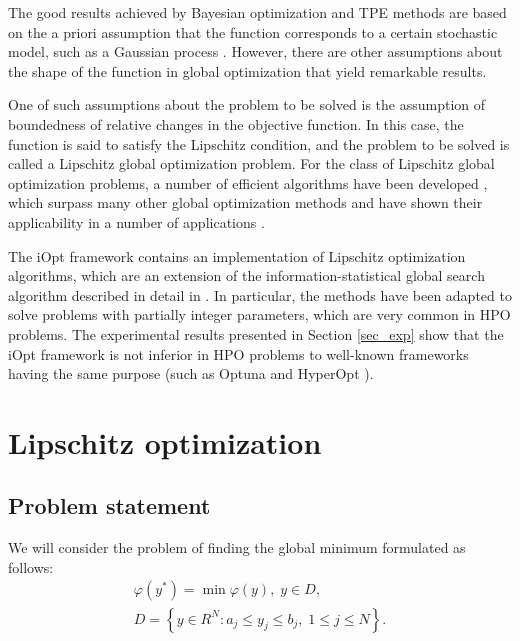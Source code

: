 \documentclass[iicol]{sn-jnl}
\theoremstyle{thmstyleone}%
\theoremstyle{thmstyletwo}%
\theoremstyle{thmstylethree}%
\begin{document}
The good results achieved by Bayesian optimization \citep{Joy2020} and TPE \citep{Watanabe2022a,Watanabe2022b} methods are based on the a priori assumption that the function corresponds to a certain stochastic model, such as a Gaussian process \citep{Rasmussen2005}. However, there are other assumptions about the shape of the function in global optimization that yield remarkable results. 

One of such assumptions about the problem to be solved is the assumption of boundedness of relative changes in the objective function. In this case, the function is said to satisfy the Lipschitz condition, and the problem to be solved is called a Lipschitz global optimization problem. For the class of Lipschitz global optimization problems, a number of efficient algorithms have been developed \citep{Jones2021,Paulavicius2020,Strongin2020,Sergeyev2017,PaulaviciusZilinskas2014}, which surpass many other global optimization methods \citep{Sergeyev2018} and have shown their applicability in a number of applications \citep{Kvasov2008,CANDELIERI2019,Gubaydullin2021}.

The iOpt framework contains an implementation of Lipschitz optimization algorithms, which are an extension of the information-statistical global search algorithm described in detail in \citet{Strongin2000,Sergeyev2013}. In particular, the methods have been adapted to solve problems with partially integer parameters, which are very common in HPO problems. The experimental results presented in Section \ref{sec_exp} show that the iOpt framework is not inferior in HPO problems to well-known frameworks having the same purpose (such as Optuna \citep{optuna} and HyperOpt \citep{hyperopt}).

\section{Lipschitz optimization}\label{sec_lip}

\subsection{Problem statement} 

We will consider the problem of finding the global minimum formulated as follows:
\begin{gather}
	\varphi(y^*) = \min \varphi(y), \; y \in D, \label{f_func} \\
	D = \left\{y \in R^N : a_j \leq y_j \leq b_j , \; 1 \leq j \leq N \right\}. \label{f_D}
\end{gather}
\end{document}
